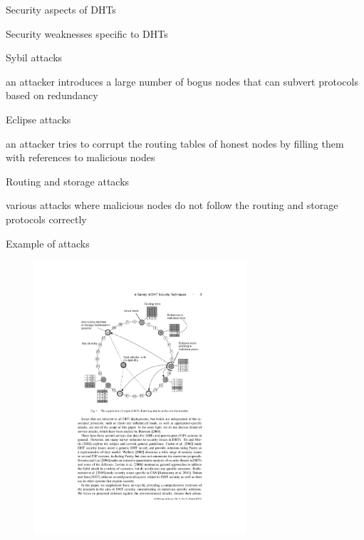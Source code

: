 \begin{frame}{Security aspects of DHTs}

\begin{block}{Security weaknesses specific to DHTs}
\BI
\item \alert{Sybil} attacks
	\BI
	\item an attacker introduces a large number of bogus nodes that can subvert protocols based on redundancy
	\EI
\item \alert{Eclipse} attacks
	\BI 
	\item an attacker tries to corrupt the routing tables of honest nodes by filling them with references to malicious nodes
	\EI
\item \alert{Routing} and \alert{storage} attacks 
	\BI
	\item various attacks where malicious nodes do not follow the routing and storage protocols correctly
	\EI
\EI
\end{block}

\smallskip
\begin{Bib}
{\scriptsize
}
\end{Bib}

\end{frame}

\begin{frame}{Example of attacks}
	
\begin{figure}
	\includegraphics[width=0.7\textwidth]{dht-security}
\end{figure}

\end{frame}


